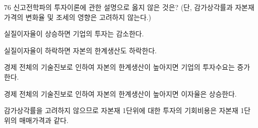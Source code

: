 \begin{question}{76}
신고전학파의 투자이론에 관한 설명으로 옳지 않은 것은? (단, 감가상각률과 자본재 가격의 변화율 및 조세의 영향은 고려하지 않는다.)
\begin{choices}
  \item 실질이자율이 상승하면 기업의 투자는 감소한다.
  \item 실질이자율이 하락하면 자본의 한계생산도 하락한다.
  \item 경제 전체의 기술진보로 인하여 자본의 한계생산이 높아지면 기업의 투자수요는 증가한다.
  \item 경제 전체의 기술진보로 인하여 자본의 한계생산이 높아지면 이자율은 상승한다.
  \item 감가상각률을 고려하지 않으므로 자본재 1단위에 대한 투자의 기회비용은 자본재 1단위의 매매가격과 같다.
\end{choices}
\end{question}
